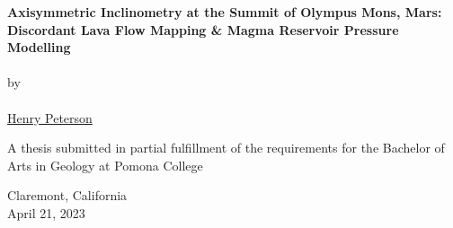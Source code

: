 \begin{titlepage}
    \begin{center}

        \phantom{.}

        \vfill
 
        \large\textbf{Axisymmetric Inclinometry at the Summit of Olympus Mons, Mars: Discordant Lava Flow Mapping \& Magma Reservoir Pressure Modelling}
        \\~\\
        by
        \\~\\
        \href{mailto:hgpa2018@mymail.pomona.edu}{Henry Peterson}

        \vfill
        \vfill
        \vfill

        A thesis submitted in partial fulfillment of the requirements for the Bachelor of Arts in Geology at Pomona College

             
        \vfill
        \vfill
        \vfill

        Claremont, California\\
        April 21, 2023

    \end{center}
 \end{titlepage}
